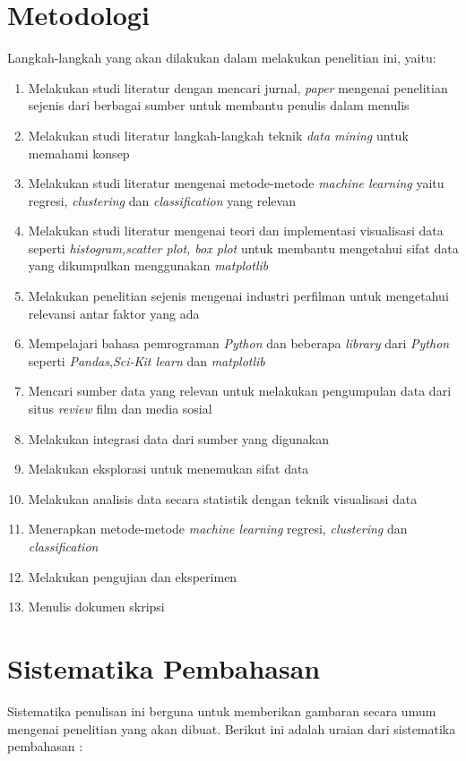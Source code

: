 \section{Metodologi}
\label{sec:metlit}
Langkah-langkah yang akan dilakukan dalam melakukan penelitian ini, yaitu: 
\begin{enumerate}
\item Melakukan studi literatur dengan mencari jurnal, \textit{paper} mengenai penelitian sejenis dari berbagai sumber untuk membantu penulis dalam menulis 
\item Melakukan studi literatur langkah-langkah teknik \textit{data mining} untuk memahami konsep
\item Melakukan studi literatur mengenai metode-metode \textit{machine learning} yaitu regresi, \textit{clustering} dan \textit{classification} yang relevan
\item Melakukan studi literatur mengenai teori dan implementasi visualisasi data seperti \textit{histogram,scatter plot, box plot} untuk membantu mengetahui sifat data yang dikumpulkan menggunakan \textit{matplotlib}
\item Melakukan penelitian sejenis mengenai industri perfilman untuk mengetahui relevansi antar faktor yang ada 
\item Mempelajari bahasa pemrograman \textit{Python} dan beberapa \textit{library} dari \textit{Python}  seperti \textit{Pandas},\textit{Sci-Kit learn} dan \textit{matplotlib}
\item Mencari sumber data yang relevan untuk melakukan pengumpulan data dari situs \textit{review} film dan media sosial
\item Melakukan integrasi data dari sumber yang digunakan
\item Melakukan eksplorasi untuk menemukan sifat data
\item Melakukan analisis data secara statistik  dengan teknik visualisasi data 
\item Menerapkan metode-metode \textit{machine learning} regresi, \textit{clustering} dan \textit{classification}
\item Melakukan pengujian dan eksperimen  
\item Menulis dokumen skripsi
\end{enumerate}

\section{Sistematika Pembahasan}
\label{sec:sispem}
Sistematika penulisan ini berguna untuk memberikan gambaran secara umum mengenai penelitian
yang akan dibuat. Berikut ini adalah uraian dari sistematika pembahasan :  

